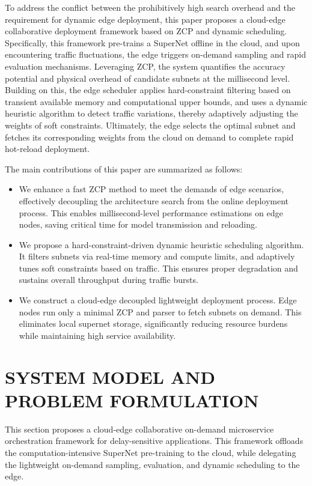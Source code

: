 \documentclass[conference]{IEEEtran}
\begin{document}
To address the conflict between the prohibitively high search overhead and the requirement for dynamic edge deployment, this paper proposes a cloud-edge collaborative deployment framework based on ZCP and dynamic scheduling. Specifically, this framework pre-trains a SuperNet offline in the cloud, and upon encountering traffic fluctuations, the edge triggers on-demand sampling and rapid evaluation mechanisms. Leveraging ZCP, the system quantifies the accuracy potential and physical overhead of candidate subnets at the millisecond level. Building on this, the edge scheduler applies hard-constraint filtering based on transient available memory and computational upper bounds, and uses a dynamic heuristic algorithm to detect traffic variations, thereby adaptively adjusting the weights of soft constraints. Ultimately, the edge selects the optimal subnet and fetches its corresponding weights from the cloud on demand to complete rapid hot-reload deployment.

The main contributions of this paper are summarized as follows:
\begin{itemize}
\item We enhance a fast ZCP method to meet the demands of edge scenarios, effectively decoupling the architecture search from the online deployment process. This enables millisecond-level performance estimations on edge nodes, saving critical time for model transmission and reloading.
\item We propose a hard-constraint-driven dynamic heuristic scheduling algorithm. It filters subnets via real-time memory and compute limits, and adaptively tunes soft constraints based on traffic. This ensures proper degradation and sustains overall throughput during traffic bursts.
\item We construct a cloud-edge decoupled lightweight deployment process. Edge nodes run only a minimal ZCP and parser to fetch subnets on demand. This eliminates local supernet storage, significantly reducing resource burdens while maintaining high service availability.
\end{itemize}

\section{SYSTEM MODEL AND PROBLEM FORMULATION}
This section proposes a cloud-edge collaborative on-demand microservice orchestration framework for delay-sensitive applications. This framework offloads the computation-intensive SuperNet pre-training to the cloud, while delegating the lightweight on-demand sampling, evaluation, and dynamic scheduling to the edge.
\end{document}
